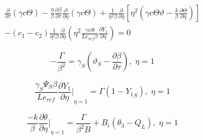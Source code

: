 \begin{multline}
 \frac{\partial }{\partial \tau }\left({\gamma }c\Theta\right)-\frac{\eta}{\beta }\frac{\partial \beta }{\partial \tau }\frac{\partial }{\partial \eta }\left(\gamma c\Theta\right)+\frac{1}{{\eta }^{2}\beta }\frac{\partial }{\partial \eta }\left[{\eta }^{2}\left(\gamma c\Theta \vartheta- \frac{k }{\beta }\frac{\partial \Theta}{\partial \eta}\right)\right]\\ -\left({c}_{1}-{c}_{2}\right)\frac{1}{{\eta }^{2}\beta }\frac{\partial }{\partial \eta }\left({\eta }^{2}\frac{\gamma \psi \theta }{Le_{ref}\beta }\frac{\partial {Y}_{1}}{\partial \eta }\right) =0  
\end{multline}

\begin{equation}
 -\frac{\Gamma }{{\beta }^{2}}={\gamma }_{S}\left({\vartheta }_{S}-\frac{\partial \beta }{\partial \tau }\right), \; \eta =1 
\end{equation}

\begin{equation}
 \frac{{\gamma }_{S}{\Psi }_{S}\beta }{L{e}_{ref}}{\frac{\partial {Y}_{1}}{\partial \eta }|}_{\eta =1}=\Gamma\left(1-{Y_1}_{S}\right), \;\eta =1 
\end{equation}

\begin{equation}
 \frac{-k}{\beta }{\frac{\partial \theta }{\partial \eta }|}_{\eta =1}=\frac{\Gamma }{{\beta }^{2}B}+{B}_{i}\left({\theta }_{3}-{Q}_{L}\right), \;\eta =1 
\end{equation}
 
 
